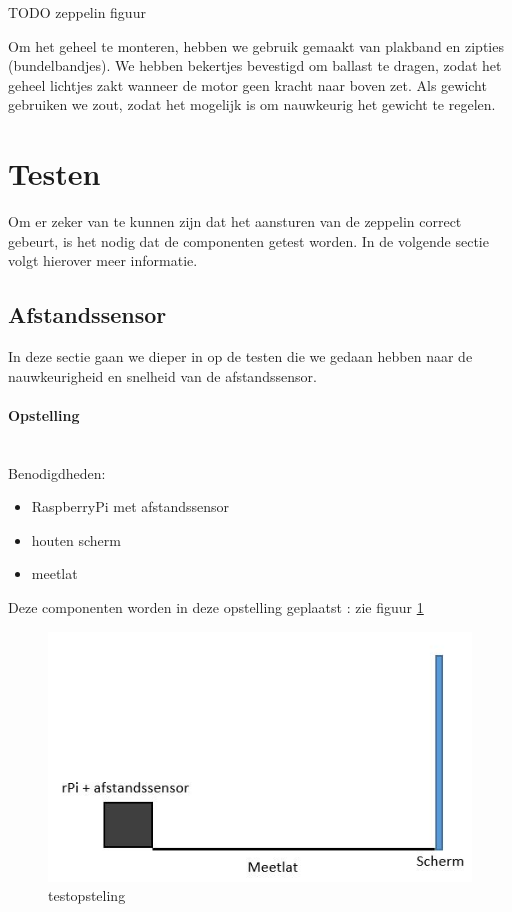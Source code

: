 \documentclass[eind]{penoverslag}
\begin{document}
TODO zeppelin figuur

Om het geheel te monteren, hebben we gebruik gemaakt van plakband en zipties (bundelbandjes). We hebben bekertjes bevestigd om ballast te dragen, zodat het geheel lichtjes zakt wanneer de motor geen kracht naar boven zet. Als gewicht gebruiken we zout, zodat het mogelijk is om nauwkeurig het gewicht te regelen. \\

\section{Testen}

Om er zeker van te kunnen zijn dat het aansturen van de zeppelin correct gebeurt, is het nodig dat de componenten getest worden. In de volgende sectie volgt hierover meer informatie. \\
\subsection{Afstandssensor}

In deze sectie gaan we dieper in op de testen die we gedaan hebben naar de nauwkeurigheid en snelheid van de afstandssensor.

\paragraph{Opstelling} ~\\ 
Benodigdheden:
\begin{itemize}
	\item RaspberryPi met afstandssensor
	\item houten scherm
	\item meetlat
\end{itemize}
Deze componenten worden in deze opstelling geplaatst : zie figuur \ref{opstelling}

\begin{figure}[ht!]%
\centering
\includegraphics[scale=0.6]{opstelling.jpg}%
\caption{testopsteling}%
\label{opstelling}%
\end{figure}
\end{document}
